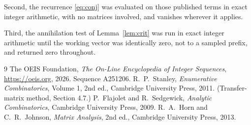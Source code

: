 \documentclass[11pt,a4paper]{article}
\theoremstyle{plain}
\theoremstyle{definition}
\begin{document}
Second, the recurrence \eqref{eq:conj} was evaluated on those published terms in exact
integer arithmetic, with no matrices involved, and vanishes wherever it applies.

Third, the annihilation test of Lemma~\ref{lem:crit} was run in exact integer arithmetic
until the working vector was identically zero, not to a sampled prefix, and returned zero
throughout.

\begin{thebibliography}{9}
 The OEIS Foundation, \emph{The On-Line Encyclopedia of Integer
Sequences}, \url{https://oeis.org}, 2026. Sequence A251206.
 R.~P.~Stanley, \emph{Enumerative Combinatorics}, Volume 1, 2nd ed.,
Cambridge University Press, 2011. (Transfer-matrix method, Section 4.7.)
 P.~Flajolet and R.~Sedgewick, \emph{Analytic Combinatorics}, Cambridge
University Press, 2009.
 R.~A.~Horn and C.~R.~Johnson, \emph{Matrix Analysis}, 2nd ed., Cambridge
University Press, 2013.
\end{thebibliography}
\end{document}
